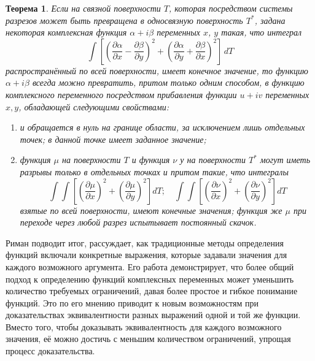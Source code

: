 \documentclass[a4paper,12pt]{article}
\newtheorem*{theorem}{Теорема}
\theoremstyle{remark}
\begin{document}
\begin{theorem}
  Если на связной поверхности $T$, которая посредством системы
  разрезов может быть превращена в односвязную поверхность
  $T^*$, задана некоторая комплексная функция
  $\alpha +i\beta$ переменных $x$, $y$ такая, что интеграл
  \[
    \int
    \left[
      \left( \frac{\partial \alpha}{\partial x} - \frac{\partial \beta}{\partial y} \right)^2 +
      \left( \frac{\partial \alpha}{\partial y} + \frac{\partial \beta}{\partial x} \right)^2
      \right] \, dT
  \]
  распространённый по всей поверхности, имеет конечное значение, то функцию $\alpha + i \beta$ всегда
  можно превратить, притом только одним способом, в функцию комплексного переменного
  посредством прибавления функции $u+iv$ переменных $x, y$, обладающей следующими свойствами:
  \begin{enumerate}
    \item и обращается в нуль на границе области, за исключением лишь отдельных точек; в данной точке имеет заданное значение;
    \item функция $\mu$ на поверхности $T$ и функция $\nu$ у на поверхности $T^*$ могут иметь разрывы только в отдельных точках и притом такие, что интегралы
          \[
            \int \int \left[ \left(\frac{\partial \mu}{\partial x}\right)^2 + \left(\frac{\partial \mu}{\partial y} \right)^2 \right]dT; \quad
            \int \int \left[ \left(\frac{\partial \nu}{\partial x}\right)^2 + \left(\frac{\partial \nu}{\partial y} \right)^2 \right]dT
          \]
          взятые по всей поверхности, имеют конечные значения; функция же $\mu$ при переходе через
          любой разрез испытывает постоянный скачок.
  \end{enumerate}
\end{theorem}

Риман подводит итог, рассуждает, как традиционные методы определения функций
включали конкретные выражения, которые задавали значения
для каждого возможного аргумента. Его работа демонстрирует,
что более общий подход к определению функций комплексных
переменных может уменьшить количество требуемых ограничений,
давая более простое и гибкое понимание функций.
Это по его мнению приводит к новым возможностям при доказательствах
эквивалентности разных выражений одной и той же функции.
Вместо того, чтобы доказывать эквивалентность для каждого
возможного значения, её можно достичь с меньшим количеством
ограничений, упрощая процесс доказательства.
\end{document}
